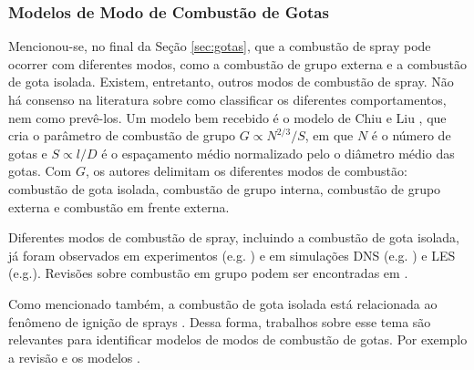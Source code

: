  



\subsubsection{Modelos de Modo de Combustão de Gotas}

Mencionou-se, no final da Seção \ref{sec:gotas}, que a combustão de spray pode ocorrer com diferentes modos, como a combustão de grupo externa e a combustão de gota isolada.
Existem, entretanto, outros modos de combustão de spray.
Não há consenso na literatura sobre como classificar os diferentes comportamentos, nem como prevê-los.
Um modelo bem recebido é o modelo de Chiu e Liu , que cria o parâmetro de combustão de grupo $G\propto N^{2/3}/S$, em que $N$ é o número de gotas e $S\propto l/D$ é o espaçamento médio normalizado pelo o diâmetro médio das gotas.
Com $G$, os autores delimitam os diferentes modos de combustão: combustão de gota isolada, combustão de grupo interna, combustão de grupo externa e combustão em frente externa.


Diferentes modos de combustão de spray, incluindo a combustão de gota isolada, já foram observados em experimentos (e.g. ) e em simulações DNS (e.g. ) e LES (e.g.).
Revisões sobre combustão em grupo podem ser encontradas em \cite{Annamalai1992,SirignanoW2014}.

Como mencionado também, a combustão de gota isolada está relacionada ao fenômeno de ignição de sprays \cite{AggarwalS2014}.
Dessa forma, trabalhos sobre esse tema são relevantes para identificar modelos de modos de combustão de gotas.
Por exemplo a revisão  e os modelos . 




